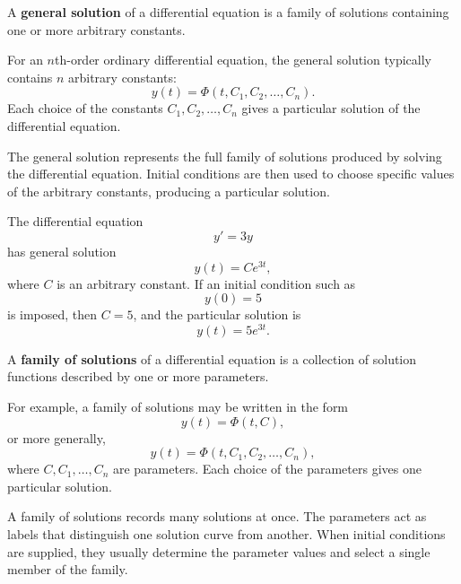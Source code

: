 
\begin{definition}
A \textbf{general solution} of a differential equation is a family of solutions containing one or more arbitrary constants.

For an $n$th-order ordinary differential equation, the general solution typically contains $n$ arbitrary constants:
\[
y(t)=\Phi(t,C_1,C_2,\dots,C_n).
\]
Each choice of the constants $C_1,C_2,\dots,C_n$ gives a particular solution of the differential equation.
\end{definition}

\begin{remark*}[Interpretation]
The general solution represents the full family of solutions produced by solving the differential equation. Initial conditions are then used to choose specific values of the arbitrary constants, producing a particular solution.
\end{remark*}

\begin{example}
The differential equation
\[
y'=3y
\]
has general solution
\[
y(t)=Ce^{3t},
\]
where $C$ is an arbitrary constant. If an initial condition such as
\[
y(0)=5
\]
is imposed, then $C=5$, and the particular solution is
\[
y(t)=5e^{3t}.
\]
\end{example}




\begin{definition}
A \textbf{family of solutions} of a differential equation is a collection of solution functions described by one or more parameters.

For example, a family of solutions may be written in the form
\[
y(t)=\Phi(t,C),
\]
or more generally,
\[
y(t)=\Phi(t,C_1,C_2,\dots,C_n),
\]
where $C,C_1,\dots,C_n$ are parameters. Each choice of the parameters gives one particular solution.
\end{definition}

\begin{remark*}[Interpretation]
A family of solutions records many solutions at once. The parameters act as labels that distinguish one solution curve from another. When initial conditions are supplied, they usually determine the parameter values and select a single member of the family.
\end{remark*}

